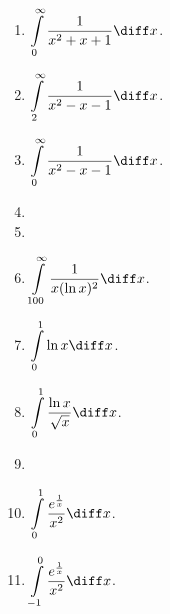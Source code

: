 \begin{multicols}{2}
\begin{enumerate}[ref={\fcProblemRef}]
\item $\displaystyle \int\limits_{0}^{\infty}\frac{1}{x^2+x+1} \diff x$.

\item $\displaystyle \int\limits_{2}^{\infty}\frac{1}{x^2-x-1} \diff x$.

\item $\displaystyle \int\limits_{0}^{\infty}\frac{1}{x^2-x-1} \diff x$.

\item 
\item 

\item $\displaystyle \int\limits_{100}^{\infty} \frac{1}{x(\ln x)^2} \diff x$.

\item $\displaystyle \int\limits_{0}^{1}\ln x \diff x$.

\item $\displaystyle \int\limits_{0}^{1}\frac{\ln x}{\sqrt{x}} \diff x$.

\item 
\item $\displaystyle \int\limits_{0}^{1} \frac{e^{\frac{1}{x}}}{x^2} \diff x$.

\item $\displaystyle \int\limits_{-1}^{0} \frac{e^{\frac{1}{x}}}{x^2} \diff x$.


\end{enumerate}
\end{multicols}
